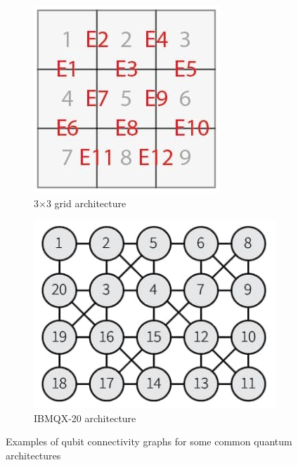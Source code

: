 \documentclass[%
 reprint,
 amsmath,amssymb,
 aps,
]{revtex4-2}
\begin{document}
\begin{figure}[tp]
    \centering
    \begin{subfigure}[b]{0.42\linewidth}
        \includegraphics[width=\linewidth]{images/device-grid.jpg}
        \caption{3$\times$3 grid architecture\label{fig:3-3-arch}}
    \end{subfigure}
    \begin{subfigure}[b]{0.56\linewidth}
        \includegraphics[width=\linewidth]{images/device-ibmqx.jpg}
        \caption{IBMQX-20 architecture}
    \end{subfigure}
    \caption{Examples of qubit connectivity graphs for some common quantum architectures}
    \label{fig:topology-example}
\end{figure}
\end{document}
